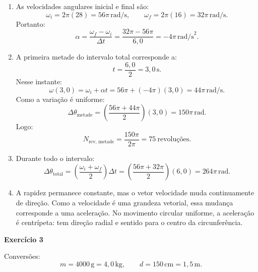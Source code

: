 \documentclass[12pt]{article}
\begin{document}
	\begin{enumerate}[label=\textbf{\alph*)}]
		\item As velocidades angulares inicial e final são:
		\[
		\omega_i=2\pi(28)=56\pi\,\text{rad/s},
		\qquad
		\omega_f=2\pi(16)=32\pi\,\text{rad/s}.
		\]
		Portanto:
		\[
		\alpha=\frac{\omega_f-\omega_i}{\Delta t}
		=\frac{32\pi-56\pi}{6,0}
		=-4\pi\,\text{rad/s}^2.
		\]

		\item A primeira metade do intervalo total corresponde a:
		\[
		t=\frac{6,0}{2}=3,0\,\text{s}.
		\]
		Nesse instante:
		\[
		\omega(3,0)
		=\omega_i+\alpha t
		=56\pi+(-4\pi)(3,0)
		=44\pi\,\text{rad/s}.
		\]
		Como a variação é uniforme:
		\[
		\Delta\theta_{\text{metade}}
		=\left(\frac{56\pi+44\pi}{2}\right)(3,0)
		=150\pi\,\text{rad}.
		\]
		Logo:
		\[
		N_{\text{rev, metade}}
		=\frac{150\pi}{2\pi}
		=75\ \text{revoluções}.
		\]

		\item Durante todo o intervalo:
		\[
		\Delta\theta_{\text{total}}
		=\left(\frac{\omega_i+\omega_f}{2}\right)\Delta t
		=\left(\frac{56\pi+32\pi}{2}\right)(6,0)
		=264\pi\,\text{rad}.
		\]

		\item A rapidez permanece constante, mas o vetor velocidade muda continuamente de
		direção. Como a velocidade é uma grandeza vetorial, essa mudança corresponde a uma
		aceleração. No movimento circular uniforme, a aceleração é centrípeta: tem direção
		radial e sentido para o centro da circunferência.
	\end{enumerate}

	\newpage

	\textbf{Exercício 3}

	Conversões:
	\[
	m=4000\,\text{g}=4,0\,\text{kg},
	\qquad
	d=150\,\text{cm}=1,5\,\text{m}.
	\]
\end{document}
